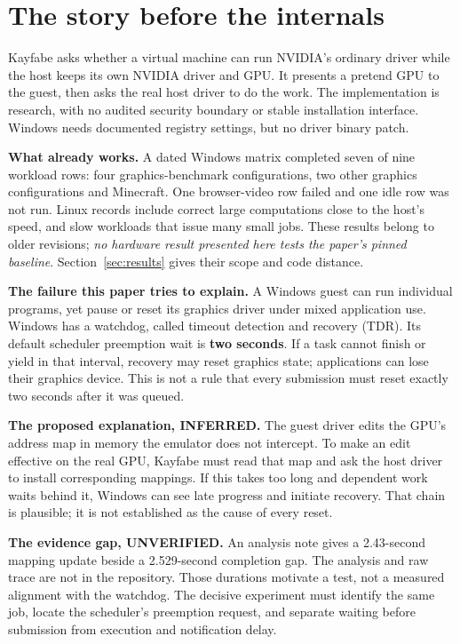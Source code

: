 \section{The story before the internals}
\label{sec:attack}

Kayfabe asks whether a virtual machine can run NVIDIA's ordinary driver while the host keeps
its own NVIDIA driver and GPU. It presents a pretend GPU to the guest, then asks the real host
driver to do the work. The implementation is research, with no audited security boundary or
stable installation interface. Windows needs documented registry settings, but no driver
binary patch.

\textbf{What already works.} A dated Windows matrix completed seven of nine workload rows:
four graphics-benchmark configurations, two other graphics configurations and Minecraft.
One browser-video row failed and one idle row was not run. Linux records include correct
large computations close to the host's speed, and slow workloads that issue many small jobs.
These results belong to older revisions; \emph{no hardware result presented here tests the
paper's pinned baseline}. Section~\ref{sec:results} gives their scope and code distance.

\textbf{The failure this paper tries to explain.} A Windows guest can run individual programs,
yet pause or reset its graphics driver under mixed application use. Windows has a watchdog,
called timeout detection and recovery (TDR). Its default scheduler preemption wait is
\textbf{two seconds}. If a task cannot finish or yield in that interval, recovery may reset
graphics state; applications can lose their graphics device. This is not a rule that every
submission must reset exactly two seconds after it was queued.

\textbf{The proposed explanation, INFERRED.} The guest driver edits the GPU's address map in
memory the emulator does not intercept. To make an edit effective on the real GPU, Kayfabe
must read that map and ask the host driver to install corresponding mappings. If this takes
too long and dependent work waits behind it, Windows can see late progress and initiate
recovery. That chain is plausible; it is not established as the cause of every reset.

\textbf{The evidence gap, UNVERIFIED.} An analysis note gives a 2.43-second mapping update
beside a 2.529-second completion gap. The analysis and raw trace are not in the repository.
Those durations motivate a test, not a measured alignment with the watchdog. The decisive
experiment must identify the same job, locate the scheduler's preemption request, and separate
waiting before submission from execution and notification delay.

